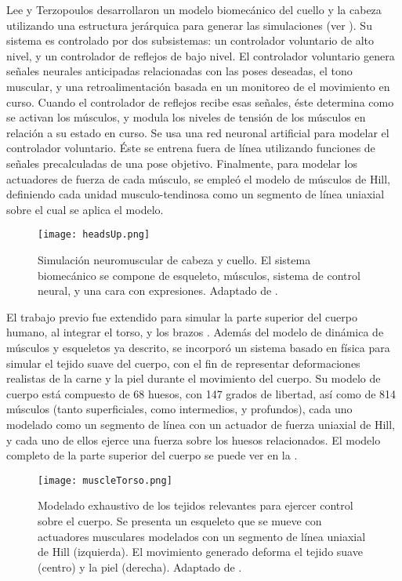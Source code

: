 Lee y Terzopoulos \citep{lee2006heads} desarrollaron un modelo biomecánico del cuello y la cabeza utilizando una estructura jerárquica para generar las simulaciones (ver ). Su sistema es controlado por dos subsistemas: un controlador voluntario de alto nivel, y un controlador de reflejos de bajo nivel. El controlador voluntario genera señales neurales anticipadas relacionadas con las poses deseadas, el tono muscular, y una retroalimentación basada en un monitoreo de el movimiento en curso. Cuando el controlador de reflejos recibe esas señales, éste determina como se activan los músculos, y modula los niveles de tensión de los músculos en relación a su estado en curso. Se usa una red neuronal artificial para modelar el controlador voluntario. Éste se entrena fuera de línea utilizando funciones de señales precalculadas de una pose objetivo. Finalmente, para modelar los actuadores de fuerza de cada músculo, se empleó el modelo de músculos de Hill, definiendo cada unidad musculo-tendinosa como un segmento de línea uniaxial sobre el cual se aplica el modelo. 

\begin{figure}
	\centering
		\texttt{[image: headsUp.png]}
	\caption[Simulación neuromuscular de cabeza y cuello.]{Simulación neuromuscular de cabeza y cuello. El sistema biomecánico se compone de esqueleto, músculos, sistema de control neural, y una cara con expresiones. Adaptado de \citep{lee2006heads}.}
		\label{fig:headsUp}
\end{figure}

El trabajo previo fue extendido para simular la parte superior del cuerpo humano, al integrar el torso, y los brazos \citep{lee2009comprehensive}. Además del modelo de dinámica de músculos y esqueletos ya descrito, se incorporó un sistema basado en física para simular el tejido suave del cuerpo, con el fin de representar deformaciones realistas de la carne y la piel durante el movimiento del cuerpo. Su modelo de cuerpo está compuesto de 68 huesos, con 147 grados de libertad, así como de 814 músculos (tanto superficiales, como intermedios, y profundos), cada uno modelado como un segmento de línea con un actuador de fuerza uniaxial de Hill, y cada uno de ellos ejerce una fuerza sobre los huesos relacionados. El modelo completo de la parte superior del cuerpo se puede ver en la .

\begin{figure}
	\centering
		\texttt{[image: muscleTorso.png]}
	\caption[Simulación de la parte superior del cuerpo.]{Modelado exhaustivo de los tejidos relevantes para ejercer control sobre el cuerpo. Se presenta un esqueleto que se mueve con actuadores musculares modelados con un segmento de línea uniaxial de Hill (izquierda). El movimiento generado deforma el tejido suave (centro) y la piel (derecha). Adaptado de \citep{lee2009comprehensive}.}
		\label{fig:muscleTorso}
\end{figure}

